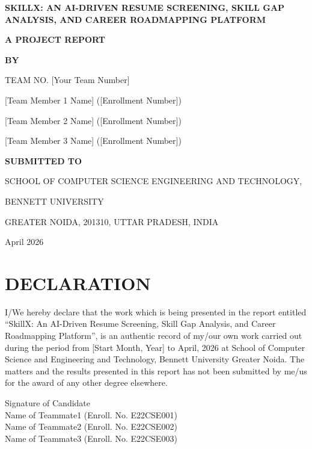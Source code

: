 \documentclass[12pt,a4paper]{report}
\begin{document}
\begin{titlepage}
    \centering
    \vspace*{1in}
    {\Huge \bfseries SKILLX: AN AI-DRIVEN RESUME SCREENING, SKILL GAP ANALYSIS, AND CAREER ROADMAPPING PLATFORM\par}
    \vspace{1.5in}
    {\Large \bfseries A PROJECT REPORT\par}
    \vspace{0.5in}
    {\large \bfseries BY\par}
    {\large TEAM NO. [Your Team Number]\par}
    {\large [Team Member 1 Name] ([Enrollment Number])\par}
    {\large [Team Member 2 Name] ([Enrollment Number])\par}
    {\large [Team Member 3 Name] ([Enrollment Number])\par}
    \vfill
    {\large \bfseries SUBMITTED TO\par}
    {\large SCHOOL OF COMPUTER SCIENCE ENGINEERING AND TECHNOLOGY, \par}
    {\large BENNETT UNIVERSITY\par}
    {\large GREATER NOIDA, 201310, UTTAR PRADESH, INDIA\par}
    {\large April 2026\par}
\end{titlepage}

\chapter*{DECLARATION}
I/We hereby declare that the work which is being presented in the report entitled ``SkillX: An AI-Driven Resume Screening, Skill Gap Analysis, and Career Roadmapping Platform'', is an authentic record of my/our own work carried out during the period from [Start Month, Year] to April, 2026 at School of Computer Science and Engineering and Technology, Bennett University Greater Noida. The matters and the results presented in this report has not been submitted by me/us for the award of any other degree elsewhere.

\vspace{1in}
\noindent Signature of Candidate \\
Name of Teammate1 (Enroll. No. E22CSE001) \\
Name of Teammate2 (Enroll. No. E22CSE002) \\
Name of Teammate3 (Enroll. No. E22CSE003)
\end{document}
